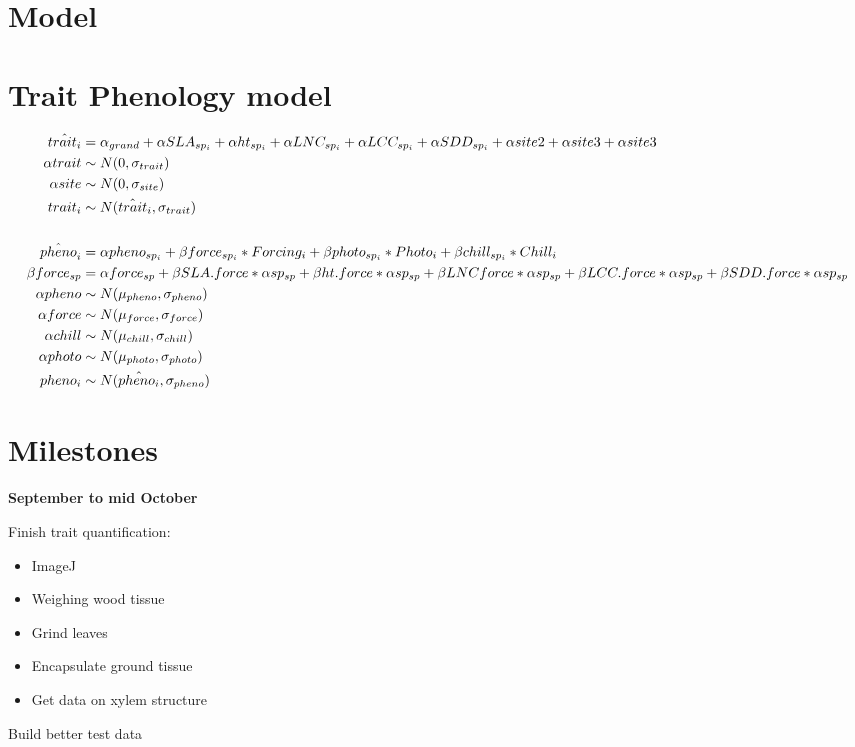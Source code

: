 \documentclass[11pt,a4paper,oneside]{article}
\begin{document}
\section*{Model}


\section{Trait Phenology model}
\begin{align*}
\hat{trait_i} &= \alpha_{grand} + \alpha SLA_{sp_i}  + \alpha ht_{sp_i}  +  \alpha LNC_{sp_i}  + \alpha LCC_{sp_i}  + \alpha SDD_{sp_i}  + \alpha site2 + \alpha site3 + \alpha site3 \\
\alpha trait & \sim N(0, \sigma_{trait}) \\
\alpha site & \sim N(0, \sigma_{site}) \\
trait_i & \sim N(\hat{trait}_i, \sigma_{trait}) \\
\vspace{1ex}\\
\hat{pheno}_i  &= \alpha pheno_{sp_i} + \beta force_{sp_i} * Forcing_{i} + \beta photo_{sp_i}  * Photo_{i} + \beta chill_{sp_i} * Chill_{i} \\
\beta force_{sp} &= \alpha force_{sp} + \beta SLA.force * \alpha sp_{sp} + \beta ht.force * \alpha sp_{sp} + \beta LNCforce * \alpha sp_{sp} +  \beta LCC.force * \alpha sp_{sp} + \beta SDD.force * \alpha sp_{sp}\\
\alpha pheno & \sim N(\mu_{pheno}, \sigma_{pheno}) \\
\alpha force& \sim N(\mu_{force}, \sigma_{force}) \\
\alpha chill & \sim N(\mu_{chill}, \sigma_{chill}) \\
\alpha photo & \sim N(\mu_{photo}, \sigma_{photo}) \\
pheno_{i} & \sim N(\hat{pheno_i}, \sigma_{pheno}) \\
\end{align*}


\section*{Milestones}

\textbf{September to mid October}
\par Finish trait quantification:
\begin{itemize}
\item ImageJ
\item Weighing wood tissue
\item Grind leaves
\item Encapsulate ground tissue
\item Get data on xylem structure 
\end{itemize}
\par Build better test data
\end{document}
